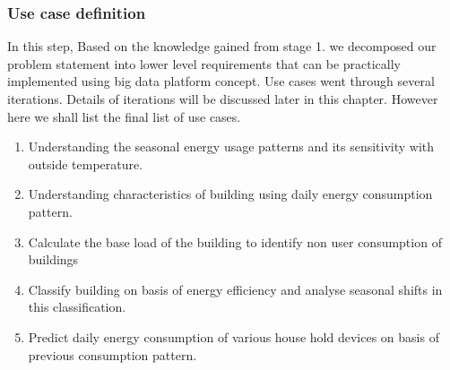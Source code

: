 \subsubsection{Use case definition} 
In this step, Based on the knowledge gained from stage 1. we decomposed our problem statement into lower level requirements that can be practically implemented using big data platform concept. Use cases went through several iterations. Details of iterations will be discussed later in this chapter. However here we shall list the final list of use cases.
\begin{enumerate}
\item Understanding the seasonal energy usage patterns and its sensitivity with outside temperature.
\item Understanding characteristics of building using daily energy consumption pattern.
\item Calculate the base load of the building to identify non user consumption of buildings
\item Classify building on basis of energy efficiency and analyse seasonal shifts in this classification.
\item Predict daily energy consumption of various house hold devices on basis of previous consumption pattern. 
\end{enumerate}
 

  

 
